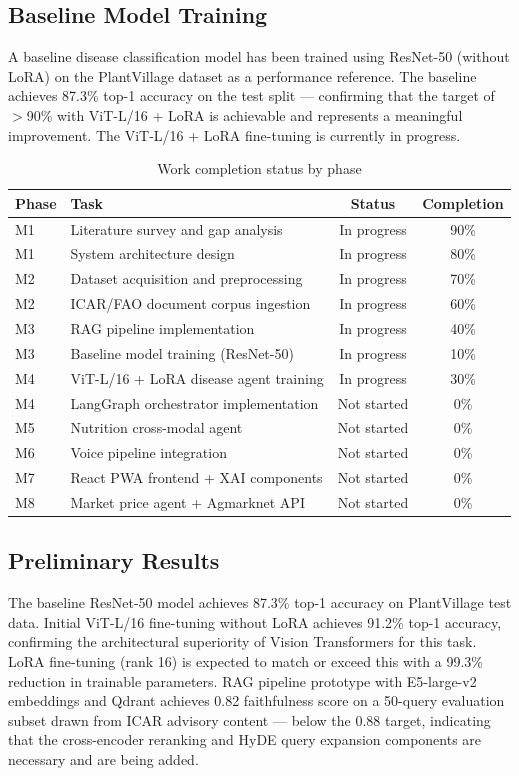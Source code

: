 \documentclass[12pt,a4paper]{article}
\begin{document}
\subsection{Baseline Model Training}
A baseline disease classification model has been trained using ResNet-50 (without LoRA) on the PlantVillage dataset as a performance reference. The baseline achieves 87.3\% top-1 accuracy on the test split --- confirming that the target of $>$90\% with ViT-L/16 + LoRA is achievable and represents a meaningful improvement. The ViT-L/16 + LoRA fine-tuning is currently in progress.

\begingroup\small
\begin{table}[htbp]
\centering
\caption{Work completion status by phase}
\label{tab:completion}
\begin{tabular}{|l|l|c|c|}
\hline
\textbf{Phase} & \textbf{Task} & \textbf{Status} & \textbf{Completion} \\ \hline
M1 & Literature survey and gap analysis & In progress & 90\% \\ \hline
M1 & System architecture design & In progress & 80\% \\ \hline
M2 & Dataset acquisition and preprocessing & In progress & 70\% \\ \hline
M2 & ICAR/FAO document corpus ingestion & In progress & 60\% \\ \hline
M3 & RAG pipeline implementation & In progress & 40\% \\ \hline
M3 & Baseline model training (ResNet-50) & In progress & 10\% \\ \hline
M4 & ViT-L/16 + LoRA disease agent training & In progress & 30\% \\ \hline
M4 & LangGraph orchestrator implementation & Not started & 0\% \\ \hline
M5 & Nutrition cross-modal agent & Not started & 0\% \\ \hline
M6 & Voice pipeline integration & Not started & 0\% \\ \hline
M7 & React PWA frontend + XAI components & Not started & 0\% \\ \hline
M8 & Market price agent + Agmarknet API & Not started & 0\% \\ \hline
\end{tabular}
\end{table}
\endgroup

\subsection{Preliminary Results}
The baseline ResNet-50 model achieves 87.3\% top-1 accuracy on PlantVillage test data. Initial ViT-L/16 fine-tuning without LoRA achieves 91.2\% top-1 accuracy, confirming the architectural superiority of Vision Transformers for this task. LoRA fine-tuning (rank 16) is expected to match or exceed this with a 99.3\% reduction in trainable parameters. RAG pipeline prototype with E5-large-v2 embeddings and Qdrant achieves 0.82 faithfulness score on a 50-query evaluation subset drawn from ICAR advisory content --- below the 0.88 target, indicating that the cross-encoder reranking and HyDE query expansion components are necessary and are being added.
\end{document}
